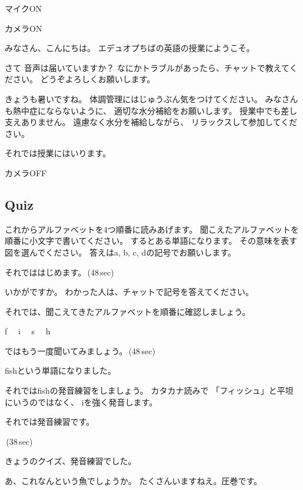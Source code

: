 \documentclass[book,jafontscale=0.9247]{jlreq}
\newenvironment{my_check}
  {\begin{itemize}
    \renewcommand\labelitemi{$\square\hspace{0.5em}$}} %
  {\end{itemize}}
\newcommand{\myStartLesson}{%
\vspace*{5pt}%
\noindent{}{\Large\gtfamily 授業スタート！}
\begin{my_check}
\item マイクON
\item カメラON\hspace{40pt}{\LARGE \ComputerMouse}
\end{my_check}
みなさん、こんにちは。
エデュオプちばの英語の授業にようこそ。\par
さて
音声は届いていますか？
なにかトラブルがあったら、チャットで教えてください。
どうぞよろしくお願いします。\par
きょうも暑いですね。
体調管理にはじゅうぶん気をつけてください。
みなさんも熱中症にならないように、
適切な水分補給をお願いします。
授業中でも差し支えありません。
遠慮なく水分を補給しながら、
リラックスして参加してください。\par
それでは授業にはいります。
\begin{my_check}
\item カメラOFF\hspace{40pt}{\LARGE \ComputerMouse}
\end{my_check}
}
\newcommand{\myMouse}{%
  {\large \ComputerMouse}
}
\begin{document}
{\large \ComputerMouse}

\newpage
\myStartLesson

\subsection{Quiz}

これからアルファベットを4つ順番に読みあげます。
聞こえたアルファベットを順番に小文字で書いてください。
するとある単語になります。
その意味を表す図を選んでください。
答えはa, b, c, dの記号でお願いします。


それでははじめます。\faVolumeUp\,(48\,sec)

いかがですか。
わかった人は、チャットで記号を答えてください。

それでは、聞こえてきたアルファベットを順番に確認しましょう。{\large \ComputerMouse}

f\,\,
{\large \ComputerMouse}\,\,
i\,\,
{\large \ComputerMouse}\,\,
s\,\,
{\large \ComputerMouse}\,\,
h

ではもう一度聞いてみましょう。\faVolumeUp\,(48\,sec)


fishという単語になりました。



それではfishの発音練習をしましょう。
カタカナ読みで
「フィッシュ」と平坦にいうのではなく、
iを強く発音します。

それでは発音練習です。

\faVolumeUp\,(38\,sec)

きょうのクイズ、発音練習でした。
\myMouse
あ、これなんという魚でしょうか。
たくさんいますねえ。圧巻です。

%
%
%
%
%
%
%
%
%
%
%
%
%
\end{document}
